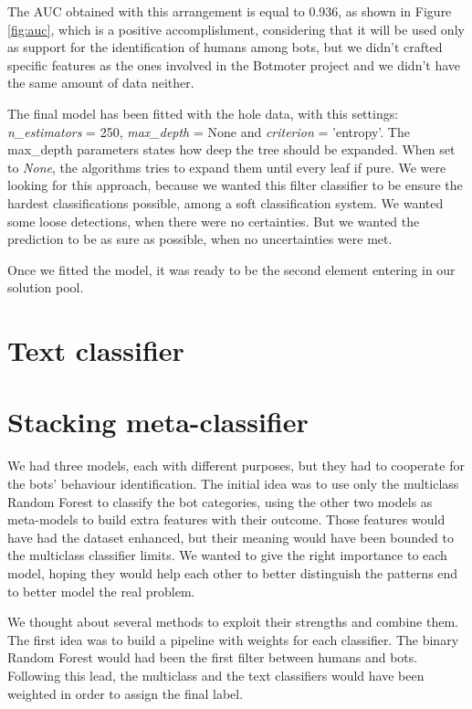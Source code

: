 The AUC obtained with this arrangement is equal to 0.936, as shown in Figure \ref{fig:auc}, which is a positive accomplishment, considering that it will be used only as support for the identification of humans among bots, but we didn't crafted specific features as the ones involved in the Botmoter project and we didn't have the same amount of data neither.

The final model has been fitted with the hole data, with this settings: \textit{ n\_estimators} = 250, \textit{max\_depth} = None and \textit{criterion} = 'entropy'.
The max\_depth parameters states how deep the tree should be expanded. When set to \textit{None}, the algorithms tries to expand them until every leaf if pure.
We were looking for this approach, because we wanted this filter classifier to be ensure the hardest classifications possible, among a soft classification system. We wanted some loose detections, when there were no certainties. But we wanted the prediction to be as sure as possible, when no uncertainties were met. 

Once we fitted the model, it was ready to be the second element entering in our solution pool.

\section{Text classifier}
\section{Stacking meta-classifier}
We had three models, each with different purposes, but they had to cooperate for the bots' behaviour identification.
The initial idea was to use only the multiclass Random Forest to classify the bot categories, using the other two models as meta-models to build extra features with their outcome.
Those features would have had the dataset enhanced, but their meaning would have been bounded to the multiclass classifier limits.
We wanted to give the right importance to each model, hoping they would help each other to better distinguish the patterns end to better model the real problem.

We thought about several methods to exploit their strengths and combine them.
The first idea was to build a pipeline with weights for each classifier. The binary Random Forest would had been the first filter between humans and bots. Following this lead, the multiclass and the text classifiers would have been weighted in order to assign the final label.

